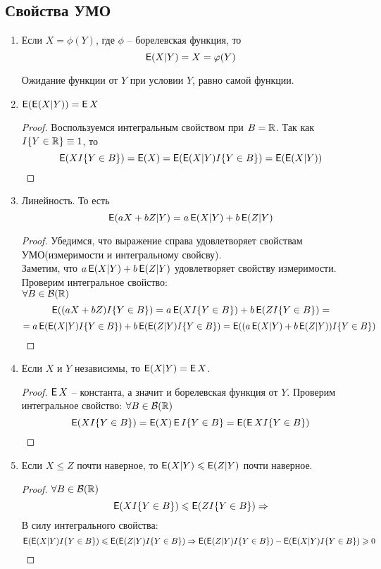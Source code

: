 \subsection{Свойства УМО}
\begin{enumerate}
    \item Если $X = \phi(Y)$, где $\phi$ -- борелевская функция, то
    $$
    \E(X|Y) = X = \phi(Y)
    $$
    \begin{remark}[Смысл]
    Ожидание функции от $Y$ при условии $Y$, равно самой функции. 
    \end{remark}
    \item $\E(\E(X|Y)) = \E X$
    \begin{proof}
    Воспользуемся интегральным свойством при $B = \mathbb{R}$. Так как $I\{Y \in \mathbb{R}\} \equiv 1$, то
    $$
    \E (XI\{Y \in B\}) = \E (X) = \E(\E(X|Y)I\{Y \in B\}) = \E(\E(X|Y))
    $$
    \end{proof}
    \item Линейность. То есть
    $$
    \E(aX + bZ|Y) = a\E(X|Y) + b\E(Z|Y) 
    $$
    \begin{proof}
    Убедимся, что выражение справа удовлетворяет свойствам \\УМО(измеримости и интегральному свойсву).\\
    Заметим, что $a\E(X|Y) + b\E(Z|Y)$ удовлетворяет свойству измеримости. Проверим интегральное свойство:\\
    $\forall B \in \mathcal{B}(\mathbb{R})$
    $$
    \E((aX + bZ)I\{Y \in B\}) = a\E(XI\{Y \in B\}) + b\E(ZI\{Y \in B\}) = $$
    $$ =  a\E(\E(X|Y)I\{Y \in B\}) + b\E(\E(Z|Y)I\{Y \in B\}) = \E((a\E(X|Y) + b\E(Z|Y))I\{Y \in B\})$$
    \end{proof}
    \item Если $X$ и $Y$ независимы, то $\E(X|Y) = \E X$. 
    \begin{proof}
    $\E X$ -- константа, а значит и борелевская функция от $Y$. Проверим интегральное свойство:
    $\forall B \in \mathcal{B}(\mathbb{R})$
    $$
    \E(XI\{Y \in B\}) = \E(X)\E I\{Y \in B\}= \E(\E X I\{Y \in B\})
    $$
    \end{proof}
    \item Если $X \leq Z$ почти наверное, то $\E(X|Y) \leq \E(Z|Y)$ почти наверное.
    \begin{proof}
    $\forall B \in \mathcal{B}(\mathbb{R})$
    $$ \E(XI\{Y \in B\}) \leq \E(ZI\{Y \in B\})\Rightarrow
    $$
    В силу интегрального свойства:
    $$
    \E(\E(X|Y)I\{Y \in B\}) \leq \E(\E(Z|Y)I\{Y \in B\}) \Rightarrow \E(\E(Z|Y)I\{Y \in B\}) - \E(\E(X|Y)I\{Y \in B\}) \geq 0 $$

\end{proof}
\end{enumerate}
